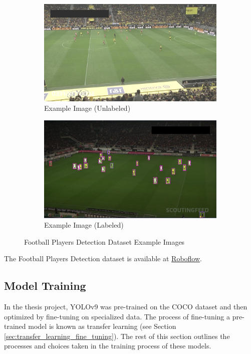 \begin{figure}[H]
    \centering
    \begin{subfigure}{0.49\textwidth}
        \centering
        \includegraphics[width=\textwidth]{Images/External_datasets/football_1.jpg}
        \caption{\centering Example Image (Unlabeled)}
    \end{subfigure}
    \hfill
    \begin{subfigure}{0.49\textwidth}
        \centering
        \includegraphics[width=\textwidth]{Images/External_datasets/football_2.png}
        \caption{\centering Example Image (Labeled)}
    \end{subfigure}
    \caption{\centering Football Players Detection Dataset Example Images}
    \label{fig:football_examples}
\end{figure}

The Football Players Detection dataset is available at \href{https://universe.roboflow.com/roboflow-jvuqo/football-players-detection-3zvbc}{Roboflow}.

\subsection{Model Training}
\label{sec:model_training}
In the thesis project, YOLOv9 was pre-trained on the COCO dataset and then optimized by fine-tuning on specialized data. The process of fine-tuning a pre-trained model is known as transfer learning (see Section \ref{sec:transfer_learning_fine_tuning}). The rest of this section outlines the processes and choices taken in the training process of these models.

